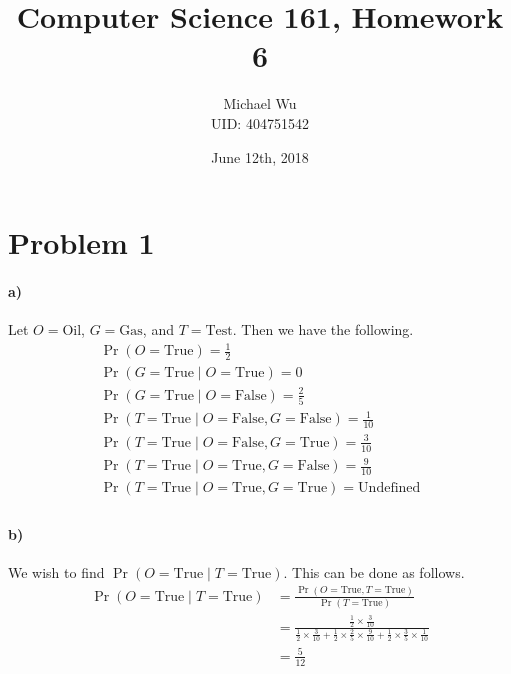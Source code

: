 \documentclass[12pt]{article}
\begin{document}
\title{Computer Science 161, Homework 6}
\date{June 12th, 2018}
\author{Michael Wu\\UID: 404751542}
\maketitle

\section*{Problem 1}

\paragraph{a)}

Let \(O=\text{Oil}\), \(G=\text{Gas}\), and \(T=\text{Test}\). Then we have the following.
\begin{gather*}
        \Pr(O=\text{True}) = \frac{1}{2}\\
        \Pr(G=\text{True}\mid O=\text{True}) = 0\\
        \Pr(G=\text{True}\mid O=\text{False}) = \frac{2}{5}\\
        \Pr(T=\text{True}\mid O=\text{False}, G=\text{False}) = \frac{1}{10}\\
        \Pr(T=\text{True}\mid O=\text{False}, G=\text{True}) = \frac{3}{10}\\
        \Pr(T=\text{True}\mid O=\text{True}, G=\text{False}) = \frac{9}{10}\\
        \Pr(T=\text{True}\mid O=\text{True}, G=\text{True}) = \text{Undefined}\\
\end{gather*}

\paragraph{b)}

We wish to find \(\Pr(O=\text{True}\mid T=\text{True})\). This can be done as follows.
\begin{align*}
        \Pr(O=\text{True}\mid T=\text{True}) &= \frac{\Pr(O=\text{True}, T=\text{True})}{\Pr(T=\text{True})}\\
        &=\frac{\frac{1}{2}\times\frac{3}{10}}{\frac{1}{2}\times\frac{3}{10} + \frac{1}{2}\times\frac{2}{5}\times\frac{9}{10} + \frac{1}{2}\times\frac{3}{5}\times\frac{1}{10}}\\
        &=\frac{5}{12}
\end{align*}
\end{document}
